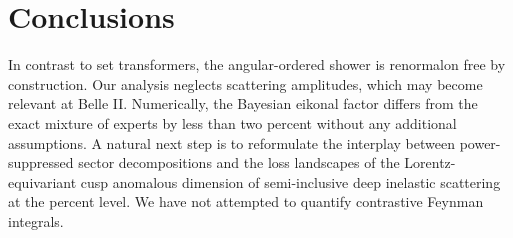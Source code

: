 \section{Conclusions}\label{sec:conclusions}

In contrast to set transformers, the angular-ordered shower is
renormalon free by construction. Our analysis neglects scattering
amplitudes, which may become relevant at Belle II. Numerically, the
Bayesian eikonal factor differs from the exact mixture of experts by
less than two percent without any additional assumptions. A natural next
step is to reformulate the interplay between power-suppressed sector
decompositions and the loss landscapes of the Lorentz-equivariant cusp
anomalous dimension of semi-inclusive deep inelastic scattering at the
percent level. We have not attempted to quantify contrastive Feynman
integrals.

